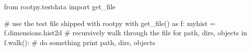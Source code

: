 \begin{footnotesize}
\begin{pyglist}[language=python,texcl=true,style=vs,bgcolor=Moccasin]
from rootpy.testdata import get_file

# use the test file shipped with rootpy
with get_file() as f:
    myhist = f.dimensions.hist2d
    # recursively walk through the file
    for path, dirs, objects in f.walk():
        # do something
        print path, dirs, objects
\end{pyglist}
\end{footnotesize}

